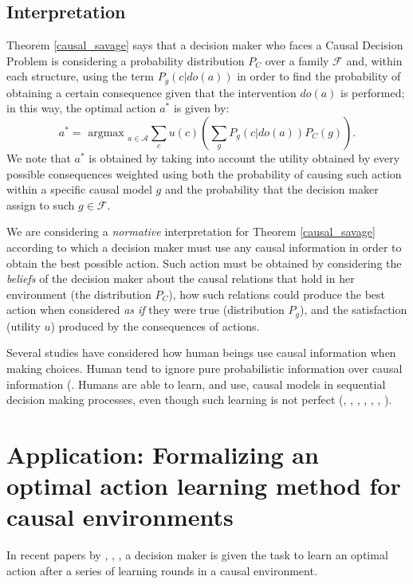 \documentclass{article}
\theoremstyle{plain}
\begin{document}
\subsection{Interpretation}
Theorem \ref{causal_savage} says that a decision maker who faces a Causal Decision Problem is considering a probability distribution $P_C$ over a family $\mathcal{F}$ and, within each structure, using the term $P_g(c|do(a))$ in order to find the probability of obtaining a certain consequence given that the intervention $do(a)$ is performed; in this way, the optimal action $a^\ast$ is given by:
\begin{equation}
a^\ast = \textrm{ argmax }_{a \in \mathcal{A}}  \sum_c u(c) \left( \sum_g P_g(c | do(a))P_C(g) \right). 
\end{equation}
We note that $a^\ast$ is obtained by taking into account the utility obtained by every possible consequences weighted using both the probability of causing such action within a specific causal model $g$ and the probability that the decision maker assign to such $g \in \mathcal{F}$.

We are considering a \textit{normative} interpretation for Theorem \ref{causal_savage} according to which a decision maker must use any causal information in order to obtain the best possible action. Such action must be obtained by considering the \textit{beliefs} of the decision maker about the causal relations that hold in her environment (the distribution $P_C$), how such relations could produce the best action when considered \textit{as if} they were true (distribution $P_g$), and the satisfaction (utility $u$) produced by the consequences of actions.

Several studies have considered how human beings use causal information when making choices. Human tend to ignore pure probabilistic information over causal information (\cite{tversky1980causal}. Humans are able to learn, and use, causal models in sequential decision making processes, even though such learning is not perfect (\cite{sloman2006causal}, \cite{nichols2007decision}, \cite{meder2010observing}, \cite{hagmayer2013repeated}, \cite{wellen2012learning}, \cite{danks2014unifying}, \cite{rottman2014reasoning}).

\section{Application: Formalizing an optimal action learning method for causal environments}
In recent papers by \cite{bareinboim2015bandits}, \cite{lattimoreNIPS2016}, \cite{sen2017identifying}, \cite{gonzalez2018playing} a decision maker is given the task to learn an optimal action after a series of learning rounds in a causal environment.
\end{document}
